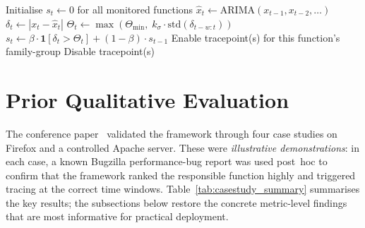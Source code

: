 \documentclass[pdflatex,sn-nature]{sn-jnl}
\theoremstyle{thmstyleone}%
\begin{document}
\begin{algorithm}[tbp]
  \caption{Online Change Detection and Trace Gating}\label{alg:changedetect}
  \begin{algorithmic}[1]
    \State Initialise $s_t \leftarrow 0$ for all monitored functions
      \State $\hat{x}_t \leftarrow \text{ARIMA}(x_{t-1}, x_{t-2}, \ldots)$
      \State $\delta_t \leftarrow |x_t - \hat{x}_t|$
      \State $\Theta_t \leftarrow \max(\Theta_{\min},\; k_\sigma \cdot \mathrm{std}(\delta_{t-w:t}))$
      \State $s_t \leftarrow \beta \cdot \mathbf{1}[\delta_t > \Theta_t] + (1-\beta)\cdot s_{t-1}$
        \State Enable tracepoint(s) for this function's family-group
      \Else
        \State Disable tracepoint(s)
      \EndIf
    \EndFor
  \end{algorithmic}
\end{algorithm}

\section{Prior Qualitative Evaluation}\label{sec:casestudies}

The conference paper~\cite{10197790} validated the framework through four
case studies on Firefox and a controlled Apache server.
These were \emph{illustrative demonstrations}: in each case, a known Bugzilla
performance-bug report was used post~hoc to confirm that the framework ranked
the responsible function highly and triggered tracing at the correct time
windows.
Table~\ref{tab:casestudy_summary} summarises the key results; the subsections
below restore the concrete metric-level findings that are most informative
for practical deployment.

\begin{table}[tbp]
\centering
{}
\caption{Summary of four qualitative case studies from~\protect\cite{10197790}.
  All overhead reductions are relative to always-on monitoring of the
  full candidate set.}
\label{tab:casestudy_summary}
\end{table}
\end{document}
